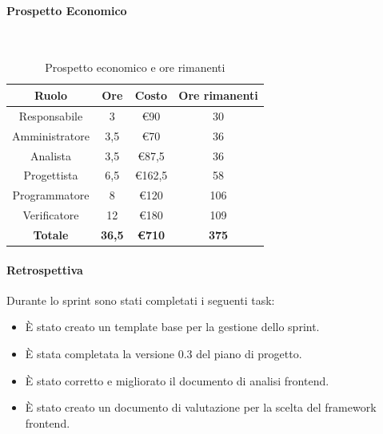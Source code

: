 \documentclass{article}
\begin{document}
                \paragraph{Prospetto Economico}\mbox{}\\
                \begin{table}[H]
                    \centering
                    \begin{tabular}{|c|c|c|c|}
                    \hline
                    \textbf{Ruolo}  & \textbf{Ore}  & \textbf{Costo} & \textbf{Ore rimanenti} \\ \hline
                    Responsabile    & 3             & €90            & 30                     \\ \hline
                    Amministratore  & 3,5           & €70            & 36                   \\ \hline
                    Analista        & 3,5           & €87,5          & 36                   \\ \hline
                    Progettista     & 6,5           & €162,5         & 58                   \\ \hline
                    Programmatore   & 8            & €120           & 106                    \\ \hline
                    Verificatore    & 12            & €180           & 109                    \\ \hline
                    \textbf{Totale} & \textbf{36,5} & \textbf{\euro710}   & \textbf{375}         \\ \hline
                    \end{tabular}
                    \caption{Prospetto economico e ore rimanenti}
                \end{table}

                \paragraph{Retrospettiva}
                Durante lo sprint sono stati completati i seguenti task:
                \begin{itemize}
                    \item È stato creato un template base per la gestione dello sprint.
                    \item È stata completata la versione 0.3 del piano di progetto.
                    \item È stato corretto e migliorato il documento di analisi frontend.
                    \item È stato creato un documento di valutazione per la scelta del framework frontend.
                \end{itemize}
                
\end{document}
